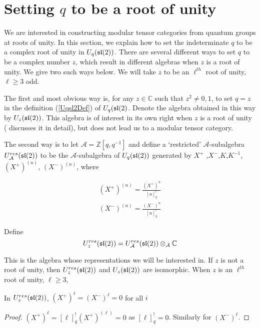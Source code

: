\section{Setting $q$ to be a root of unity}

We are interested in constructing modular tensor categories from quantum groups
at roots of unity. In this section, we explain how to set the indeterminate $q$
to be a complex root of unity in $U_q(\mathfrak{sl}(2))$. There are several different ways to
set $q$ to be a complex number $z$, which result in different algebras when $z$
is a root of unity. We give two such ways below. We will take $z$ to be an
$\ell^{th}$ root of unity, $\ell \geq 3$ odd.

The first and most obvious way is, for any $z \in \mathbb{C}$ such that $z ^2
\neq 0,1$, to set $q = z$ in the definition (\ref{Uqsl2Def}) of $U_q(\mathfrak{sl}(2)$.
Denote the algebra obtained in this way by $U_z(\mathfrak{sl}(2))$. This algebra is of
interest in its own right when $z$ is a root of unity (\cite{Jantzen1995}
discusses it in detail), but does not lead us to a modular tensor category.

The second way is to let $\mathcal{A} = \mathbb{Z}[q,q^{-1}]$ and define a
`restricted' $\mathcal{A}$-subalgebra $U_\mathcal{A}^{res}(\mathfrak{sl}(2))$ to be the
$\mathcal{A}$-subalgebra of $U_q(\mathfrak{sl}(2))$ generated by $ X^+$
,$X^-$,$K$,$K^{-1}$, $(X^+) ^{(n)}$, $(X^-)^{(n)}$, where


\begin{align}
     (X^+)^{(n)} = \frac{ (X^+)^n}{[n]^!_{q}} \\
    (X^-)^{(n)} = \frac{(X^-)^n}{[n]^!_{q}} 
\end{align}


Define 
\begin{equation}
    U_z^{res}(\mathfrak{sl}(2)) = U_\mathcal{A}^{res}(\mathfrak{sl}(2)) \otimes_\mathcal{A} \mathbb{C}
\end{equation}

This is the algebra whose representations we will be interested in.  If $z$ is
not a root of unity, then $U_z^{res}(\mathfrak{sl}(2))$ and $U_z(\mathfrak{sl}(2))$ are
isomorphic. When $z$ is an $\ell^{th}$ root of unity, $\ell \geq 3$,

\begin{lemma}
    In $U_z^{res}(\mathfrak{sl}(2))$, $ (X^+)^\ell = (X^-)^\ell = 0$ for all $i$
\end{lemma}
\begin{proof}
    $ (X^+)^\ell = [\ell]_{q}^!  (X^+)^{(\ell)} = 0$ as $[\ell]_{q}^! = 0$. Similarly for $(X^-)^\ell$.
\end{proof}

